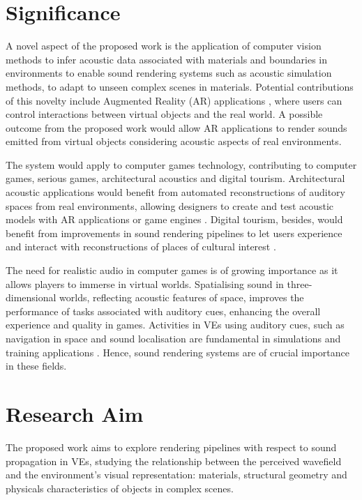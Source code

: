 \section{Significance}
A novel aspect of the proposed work is the application of computer vision methods to infer acoustic data associated with materials and boundaries in environments to enable sound rendering systems such as acoustic simulation methods, to adapt to unseen complex scenes in materials.
Potential contributions of this novelty include Augmented Reality (AR) applications \citep{liu2018technical}, where users can control interactions between virtual objects and the real world. A possible outcome from the proposed work would allow AR applications to render sounds emitted from virtual objects considering acoustic aspects of real environments. \par
The system would apply to computer games technology, contributing to computer games, serious games, architectural acoustics and digital tourism. 
Architectural acoustic applications would benefit from automated reconstructions of auditory spaces from real environments, allowing designers to create and test acoustic models with AR applications or game engines \citep{berardi2016acoustic}. Digital tourism, besides, would benefit from improvements in sound rendering pipelines to let users experience and interact with reconstructions of places of cultural interest \citep{schofield2018viking}. \par
The need for realistic audio in computer games is of growing importance as it allows players to immerse in virtual worlds. Spatialising sound in three-dimensional worlds, reflecting acoustic features of space, improves the performance of tasks associated with auditory cues, enhancing the overall experience and quality in games. 
Activities in VEs using auditory cues, such as navigation in space and sound localisation are fundamental in simulations and training applications \citep{lokki2005navigation}. Hence, sound rendering systems are of crucial importance in these fields.

\section{Research Aim}
The proposed work aims to explore rendering pipelines with respect to sound propagation in VEs, studying the relationship between the perceived wavefield and the environment’s visual representation: materials, structural geometry and physicals characteristics of objects in complex scenes.


